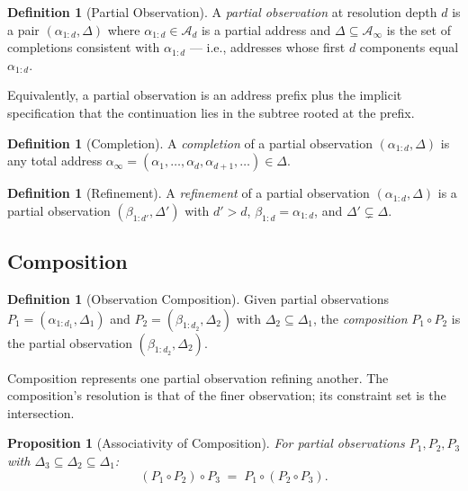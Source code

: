 \documentclass[11pt,a4paper]{article}
\newtheorem{proposition}[theorem]{Proposition}
\theoremstyle{definition}
\newtheorem{definition}[theorem]{Definition}
\theoremstyle{remark}
\newcommand{\Ac}{\mathcal{A}}
\begin{document}
\begin{definition}[Partial Observation]
\label{def:partial}
A \emph{partial observation} at resolution depth $d$ is a pair $(\alpha_{1:d}, \Delta)$ where $\alpha_{1:d} \in \Ac_d$ is a partial address and $\Delta \subseteq \Ac_\infty$ is the set of completions consistent with $\alpha_{1:d}$ --- i.e., addresses whose first $d$ components equal $\alpha_{1:d}$.
\end{definition}

Equivalently, a partial observation is an address prefix plus the implicit specification that the continuation lies in the subtree rooted at the prefix.

\begin{definition}[Completion]
\label{def:completion}
A \emph{completion} of a partial observation $(\alpha_{1:d}, \Delta)$ is any total address $\alpha_\infty = (\alpha_1, \ldots, \alpha_d, \alpha_{d+1}, \ldots) \in \Delta$.
\end{definition}

\begin{definition}[Refinement]
\label{def:refinement}
A \emph{refinement} of a partial observation $(\alpha_{1:d}, \Delta)$ is a partial observation $(\beta_{1:d'}, \Delta')$ with $d' > d$, $\beta_{1:d} = \alpha_{1:d}$, and $\Delta' \subsetneq \Delta$.
\end{definition}

\subsection{Composition}

\begin{definition}[Observation Composition]
\label{def:compose}
Given partial observations $P_1 = (\alpha_{1:d_1}, \Delta_1)$ and $P_2 = (\beta_{1:d_2}, \Delta_2)$ with $\Delta_2 \subseteq \Delta_1$, the \emph{composition} $P_1 \circ P_2$ is the partial observation $(\beta_{1:d_2}, \Delta_2)$.
\end{definition}

Composition represents one partial observation refining another. The composition's resolution is that of the finer observation; its constraint set is the intersection.

\begin{proposition}[Associativity of Composition]
\label{prop:assoc}
For partial observations $P_1, P_2, P_3$ with $\Delta_3 \subseteq \Delta_2 \subseteq \Delta_1$:
\[
(P_1 \circ P_2) \circ P_3 \;=\; P_1 \circ (P_2 \circ P_3).
\]
\end{proposition}
\end{document}
